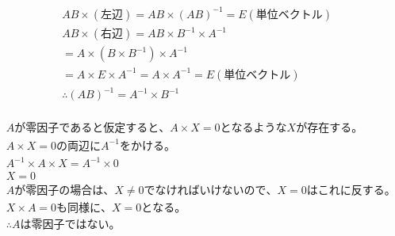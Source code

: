 \documentclass[dvipdfmx,uplatex]{jsarticle}
\begin{document}
  \newpage
  \begin{equation}
    \begin{aligned}
        &AB \times (左辺)= AB \times (AB)^{-1} = E (単位ベクトル)\nonumber\\
        &AB \times (右辺) = AB \times B^{-1} \times A^{-1} \nonumber\\
        &=A \times (B \times B^{-1}) \times A^{-1} \nonumber\\
        &=A \times E \times A^{-1} = A \times A^{-1} = E (単位ベクトル) \nonumber\\
        & \therefore (AB)^{-1} = A^{-1} \times B^{-1}\nonumber\\
    \end{aligned}
  \end{equation}

  \begin{equation}
    \begin{aligned}
        &Aが零因子であると仮定すると、A \times X = 0 となるようなXが存在する。\nonumber\\
        &A \times X = 0の両辺にA^{-1}をかける。\nonumber\\
        &A^{-1} \times A \times X =A^{-1} \times 0 \nonumber\\
        &X=0 \nonumber\\
        &Aが零因子の場合は、X \neq 0でなければいけないので、X=0はこれに反する。\nonumber\\
        &X \times A = 0も同様に、X=0となる。\nonumber\\
        &\therefore Aは零因子ではない。\nonumber\\
    \end{aligned}
  \end{equation}
\end{document}
